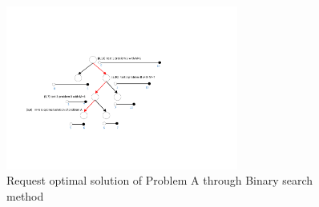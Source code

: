 \begin{figure}[tp]
  \centering
  \includegraphics[width=3.0in]{franz/binarySearch}
  \caption{Request optimal solution of Problem A  through Binary search method }
  \label{fig:binarySearch}
\end{figure}
